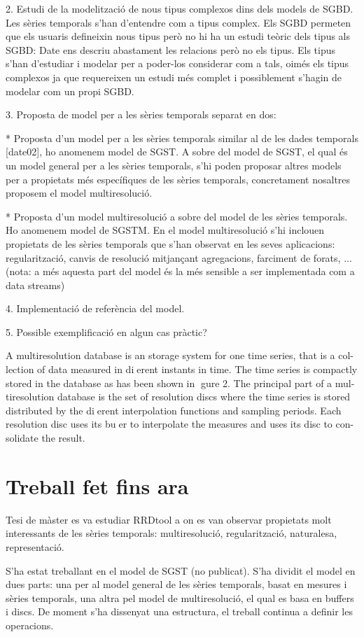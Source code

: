 2. Estudi de la modelització de nous tipus complexos dins dels models de SGBD.
Les sèries temporals s'han d'entendre com a tipus complex.
Els SGBD permeten que els usuaris defineixin nous tipus \parencite{stonebraker86} però no hi ha un estudi teòric dels tipus als SGBD: Date ens descriu abastament les relacions però no els tipus. Els tipus s'han d'estudiar i modelar per a poder-los considerar com a tals, oimés els tipus complexos ja que requereixen un estudi més complet i possiblement s'hagin de modelar com un propi SGBD. 



3. Proposta de model per a les sèries temporals separat en dos: 

* Proposta d'un model per a les sèries temporals similar al de les dades temporals [date02], ho anomenem model de SGST. A sobre del model de SGST, el qual és un model general per a les sèries temporals, s'hi poden proposar altres models per a propietats més específiques de les sèries temporals, concretament nosaltres proposem el model multiresolució.

* Proposta d'un model multiresolució a sobre del model de les sèries temporals. Ho anomenem model de SGSTM. En el model multiresolució s'hi inclouen propietats de les sèries temporals que s'han observat en les seves aplicacions: regularització, canvis de resolució mitjançant agregacions, farciment de forats, ... 
(nota: a més aquesta part del model és la més sensible a ser implementada com a data streams)

4. Implementació de referència del model.


5. Possible exemplificació en algun cas pràctic?


A multiresolution database is an storage system for one time series, that is a col-
lection of data measured in dierent instants in time. The time series is compactly
stored in the database as has been shown in gure 2. The principal part of a mul-
tiresolution database is the set of resolution discs where the time series is stored
distributed by the dierent interpolation functions and sampling periods.      Each
resolution disc uses its buer to interpolate the measures and uses its disc to con-
solidate the result.




\section{Treball fet fins ara}



Tesi de màster es va estudiar RRDtool a on es van observar propietats molt interessants de les sèries temporals: multiresolució, regularització, naturalesa, representació.


S'ha estat treballant en el model de SGST (no publicat). S'ha dividit el model en dues parts: una per al model general de les sèries temporals, basat en mesures i sèries temporals, una altra pel model de multiresolució, el qual es basa en buffers i discs. De moment s'ha dissenyat una estructura, el treball continua a definir les operacions. 


